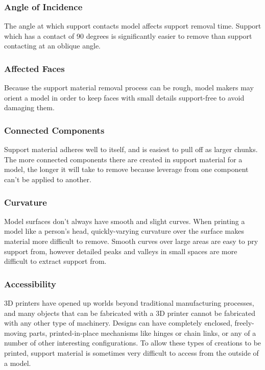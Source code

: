 \documentclass{sigchi}
\begin{document}
\subsubsection{Angle of Incidence}
The angle at which support contacts model affects support removal time.  Support which has a contact of 90 degrees is significantly easier to remove than support contacting at an oblique angle.

\subsubsection{Affected Faces}
Because the support material removal process can be rough, model makers may orient a model in order to keep faces with small details support-free to avoid damaging them.

\subsubsection{Connected Components}
Support material adheres well to itself, and is easiest to pull off as larger chunks.  The more connected components there are created in support material for a model, the longer it will take to remove because leverage from one component can't be applied to another.

\subsubsection{Curvature}
Model surfaces don't always have smooth and slight curves.  When printing a model like a person's head, quickly-varying curvature over the surface makes material more difficult to remove.  Smooth curves over large areas are easy to pry support from, however detailed peaks and valleys in small spaces are more difficult to extract support from.

\subsubsection{Accessibility}
3D printers have opened up worlds beyond traditional manufacturing processes, and many objects that can be fabricated with a 3D printer cannot be fabricated with any other type of machinery.  Designs can have completely enclosed, freely-moving parts, printed-in-place mechanisms like hinges or chain links, or any of a number of other interesting configurations.  To allow these types of creations to be printed, support material is sometimes very difficult to access from the outside of a model.
\end{document}
